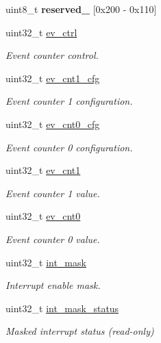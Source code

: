\begin{DoxyCompactItemize}
uint8\+\_\+t {\bfseries reserved\+\_} \mbox{[}0x200 -\/ 0x110\mbox{]}
\item 
uint32\+\_\+t \mbox{\hyperlink{group__L2C-310__cache_gad6a808e6a103d85e6c0318a25774b506}{ev\+\_\+ctrl}}
\begin{DoxyCompactList}\small\item\em Event counter control. \end{DoxyCompactList}\item 
uint32\+\_\+t \mbox{\hyperlink{group__L2C-310__cache_gae073cc44f67c7934f242eb46f12dfaae}{ev\+\_\+cnt1\+\_\+cfg}}
\begin{DoxyCompactList}\small\item\em Event counter 1 configuration. \end{DoxyCompactList}\item 
uint32\+\_\+t \mbox{\hyperlink{group__L2C-310__cache_ga6c46eba15d5dfd57721d4f1f61011c21}{ev\+\_\+cnt0\+\_\+cfg}}
\begin{DoxyCompactList}\small\item\em Event counter 0 configuration. \end{DoxyCompactList}\item 
uint32\+\_\+t \mbox{\hyperlink{group__L2C-310__cache_ga0a61743f05c11c6e07fd4ef94c141b35}{ev\+\_\+cnt1}}
\begin{DoxyCompactList}\small\item\em Event counter 1 value. \end{DoxyCompactList}\item 
uint32\+\_\+t \mbox{\hyperlink{group__L2C-310__cache_gac50adde9caa6805f0aad0da6cc3fdb0a}{ev\+\_\+cnt0}}
\begin{DoxyCompactList}\small\item\em Event counter 0 value. \end{DoxyCompactList}\item 
uint32\+\_\+t \mbox{\hyperlink{group__L2C-310__cache_gae3339ff514c3b72d3efff21a71707ac5}{int\+\_\+mask}}
\begin{DoxyCompactList}\small\item\em Interrupt enable mask. \end{DoxyCompactList}\item 
uint32\+\_\+t \mbox{\hyperlink{group__L2C-310__cache_gaf72e5a2a8db0ef5a7eeff96b80940d35}{int\+\_\+mask\+\_\+status}}
\begin{DoxyCompactList}\small\item\em Masked interrupt status (read-\/only) \end{DoxyCompactList}\item 

\end{DoxyCompactItemize}
